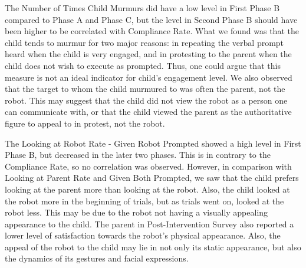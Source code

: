\documentclass{ut-thesis}
\begin{document}
The Number of Times Child Murmurs did have a low level in First Phase B compared to Phase A and Phase C, but the level in Second Phase B should have been higher to be correlated with Compliance Rate.  What we found was that the child tends to murmur for two major reasons: in repeating the verbal prompt heard when the child is very engaged, and in protesting to the parent when the child does not wish to execute as prompted.  Thus, one could argue that this measure is not an ideal indicator for child's engagement level.  We also observed that the target to whom the child murmured to was often the parent, not the robot.  This may suggest that the child did not view the robot as a person one can communicate with, or that the child viewed the parent as the authoritative figure to appeal to in protest, not the robot.

The Looking at Robot Rate - Given Robot Prompted showed a high level in First Phase B, but decreased in the later two phases.  This is in contrary to the Compliance Rate, so no correlation was observed.  However, in comparison with Looking at Parent Rate and Given Both Prompted, we saw that the child prefers looking at the parent more than looking at the robot.  Also, the child looked at the robot more in the beginning of trials, but as trials went on, looked at the robot less.  This may be due to the robot not having a visually appealing appearance to the child.  The parent in Post-Intervention Survey also reported a lower level of satisfaction towards the robot's physical appearance.  Also, the appeal of the robot to the child may lie in not only its static appearance, but also the dynamics of its gestures and facial expressions.
\end{document}
